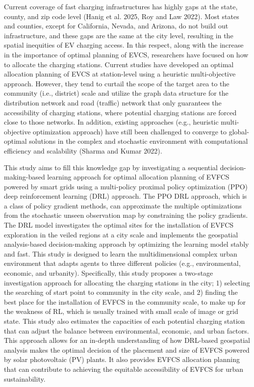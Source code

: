 \documentclass[preprint,12pt]{elsarticle}
\begin{document}
Current coverage of fast charging infrastructures has highly gaps at the state, county, and zip code level (Hanig et al. 2025, Roy and Law 2022). Most states and counties, except for California, Nevada, and Arizona, do not build out infrastructure, and these gaps are the same at the city level, resulting in the spatial inequities of EV charging access. In this respect, along with the increase in the importance of optimal planning of EVCS, researchers have focused on how to allocate the charging stations. Current studies have developed an optimal allocation planning of EVCS at station-level using a heuristic multi-objective approach. However, they tend to curtail the scope of the target area to the community (i.e., district) scale and utilize the graph data structure for the distribution network and road (traffic) network that only guarantees the accessibility of charging stations, where potential charging stations are forced close to those networks. In addition, existing approaches (e.g., heuristic multi-objective optimization approach) have still been challenged to converge to global-optimal solutions in the complex and stochastic environment with computational efficiency and scalability (Sharma and Kumar 2022).

\vspace{0.5cm}

This study aims to fill this knowledge gap by investigating a sequential decision-making-based learning approach for optimal allocation planning of EVFCS powered by smart grids using a multi-policy proximal policy optimization (PPO) deep reinforcement learning (DRL) approach. The PPO DRL approach, which is a class of policy gradient methods, can approximate the multiple optimizations from the stochastic unseen observation map by constraining the policy gradients. The DRL model investigates the optimal sites for the installation of EVFCS exploration in the veiled regions at a city scale and implements the geospatial analysis-based decision-making approach by optimizing the learning model stably and fast. This study is designed to learn the multidimensional complex urban environment that adapts agents to three different policies (e.g., environmental, economic, and urbanity). Specifically, this study proposes a two-stage investigation approach for allocating the charging stations in the city; 1) selecting the searching of start point to community in the city scale, and 2) finding the best place for the installation of EVFCS in the community scale, to make up for the weakness of RL, which is usually trained with small scale of image or grid state. This study also estimates the capacities of each potential charging station that can adjust the balance between environmental, economic, and urban factors. This approach allows for an in-depth understanding of how DRL-based geospatial analysis makes the optimal decision of the placement and size of EVFCS powered by solar photovoltaic (PV) plants. It also provides EVFCS allocation planning that can contribute to achieving the equitable accessibility of EVFCS for urban sustainability. 
\end{document}
